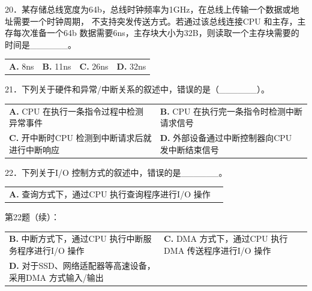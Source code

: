 \documentclass[UTF8,11pt]{ctexart}
\begin{document}
20．某存储总线宽度为64b，总线时钟频率为1GHz，在总线上传输一个数据或地址需要一个时钟周期， 不支持突发传送方式。若通过该总线连接CPU 和主存，主存每次准备一个64b 数据需要6ns，主存块大小为32B，则读取一个主存块需要的时间是\_\_\_\_\_\_。


\begin{center}\begin{tabular}{>{\raggedright\arraybackslash}p{\dimexpr(\linewidth-8\tabcolsep)/4\relax}>{\raggedright\arraybackslash}p{\dimexpr(\linewidth-8\tabcolsep)/4\relax}>{\raggedright\arraybackslash}p{\dimexpr(\linewidth-8\tabcolsep)/4\relax}>{\raggedright\arraybackslash}p{\dimexpr(\linewidth-8\tabcolsep)/4\relax}}
\textbf{A.} 8ns & \textbf{B.} 11ns & \textbf{C.} 26ns & \textbf{D.} 32ns\\[.35em]\end{tabular}\end{center}

21．下列关于硬件和异常/中断关系的叙述中，错误的是（\_\_\_\_\_\_）。


\begin{center}\begin{tabular}{>{\raggedright\arraybackslash}p{\dimexpr(\linewidth-4\tabcolsep)/2\relax}>{\raggedright\arraybackslash}p{\dimexpr(\linewidth-4\tabcolsep)/2\relax}}
\textbf{A.} CPU 在执行一条指令过程中检测异常事件 & \textbf{B.} CPU 在执行完一条指令时检测中断请求信号\\[.35em]
\textbf{C.} 开中断时CPU 检测到中断请求后就进行中断响应 & \textbf{D.} 外部设备通过中断控制器向CPU 发中断结束信号\\[.35em]\end{tabular}\end{center}

22．下列关于I/O 控制方式的叙述中，错误的是\_\_\_\_\_\_。


\begin{center}\begin{tabular}{>{\raggedright\arraybackslash}p{\dimexpr(\linewidth-4\tabcolsep)/2\relax}>{\raggedright\arraybackslash}p{\dimexpr(\linewidth-4\tabcolsep)/2\relax}}
\textbf{A.} 查询方式下，通过CPU 执行查询程序进行I/O 操作 & \\[.35em]\end{tabular}\end{center}

第22题（续）：


\begin{center}\begin{tabular}{>{\raggedright\arraybackslash}p{\dimexpr(\linewidth-4\tabcolsep)/2\relax}>{\raggedright\arraybackslash}p{\dimexpr(\linewidth-4\tabcolsep)/2\relax}}
\textbf{B.} 中断方式下，通过CPU 执行中断服务程序进行I/O 操作 & \textbf{C.} DMA 方式下，通过CPU 执行DMA 传送程序进行I/O 操作\\[.35em]
\textbf{D.} 对于SSD、网络适配器等高速设备，采用DMA 方式输入/输出 & \\[.35em]\end{tabular}\end{center}
\end{document}
